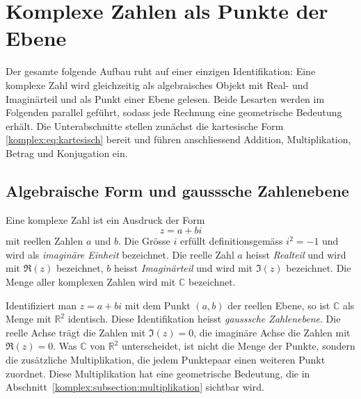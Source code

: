 %
%
\section{Komplexe Zahlen als Punkte der Ebene
\label{komplex:section:zahlenebene}}
Der gesamte folgende Aufbau ruht auf einer einzigen Identifikation:
Eine komplexe Zahl wird gleichzeitig als algebraisches Objekt
mit Real- und Imaginärteil und als Punkt einer Ebene gelesen.
Beide Lesarten werden im Folgenden parallel geführt,
sodass jede Rechnung eine geometrische Bedeutung erhält.
Die Unterabschnitte stellen zunächst die kartesische Form
\eqref{komplex:eq:kartesisch} bereit
und führen anschliessend Addition, Multiplikation, Betrag und Konjugation
ein.

%
%
\subsection{Algebraische Form und gausssche Zahlenebene
\label{komplex:subsection:algebraisch}}
Eine komplexe Zahl ist ein Ausdruck der Form
\begin{equation}
z
=
a + bi
\label{komplex:eq:kartesisch}
\end{equation}
mit reellen Zahlen $a$ und $b$.
Die Grösse $i$ erfüllt definitionsgemäss $i^2 = -1$
und wird als \emph{imaginäre Einheit} bezeichnet.
%
Die reelle Zahl $a$ heisst \emph{Realteil} und wird mit $\Re(z)$ bezeichnet,
%
$b$ heisst \emph{Imaginärteil} und wird mit $\Im(z)$ bezeichnet.
Die Menge aller komplexen Zahlen wird mit $\mathbb{C}$ bezeichnet.

Identifiziert man $z = a + bi$ mit dem Punkt $(a, b)$ der reellen Ebene,
so ist $\mathbb{C}$ als Menge mit $\mathbb{R}^2$ identisch.
Diese Identifikation heisst \emph{gausssche Zahlenebene}.
%
Die reelle Achse trägt die Zahlen mit $\Im(z) = 0$,
die imaginäre Achse die Zahlen mit $\Re(z) = 0$.
Was $\mathbb{C}$ von $\mathbb{R}^2$ unterscheidet,
ist nicht die Menge der Punkte,
sondern die zusätzliche Multiplikation,
die jedem Punktepaar einen weiteren Punkt zuordnet.
Diese Multiplikation hat eine geometrische Bedeutung,
die in Abschnitt~\ref{komplex:subsection:multiplikation} sichtbar wird.

%
%
